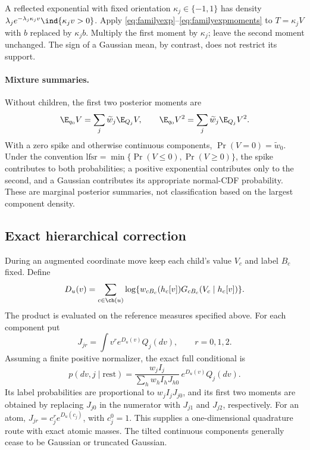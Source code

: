 A reflected exponential with fixed orientation \(\kappa_j\in\{-1,1\}\)
has density
\(\lambda_j e^{-\lambda_j\kappa_jv}\ind\{\kappa_jv>0\}\).
Apply \eqref{eq:familyexp}--\eqref{eq:familyexpmoments} to
\(T=\kappa_jV\) with \(b\) replaced by \(\kappa_jb\).
Multiply the first moment by \(\kappa_j\); leave the second moment unchanged.
The sign of a Gaussian mean, by contrast, does not restrict its support.

\paragraph{Mixture summaries.}
Without children, the first two posterior moments are
\[
\E_{q_0}V=\sum_j\widetilde w_j\E_{Q_j}V,\qquad
\E_{q_0}V^2=\sum_j\widetilde w_j\E_{Q_j}V^2.
\]
With a zero spike and otherwise continuous components,
\(\Pr(V=0)=\widetilde w_0\).
Under the convention
\(\mathrm{lfsr}=\min\{\Pr(V\leq0),\Pr(V\geq0)\}\),
the spike contributes to both probabilities; a positive exponential
contributes only to the second, and a Gaussian contributes its appropriate
normal-CDF probability. These are marginal posterior summaries, not
classification based on the largest component density.

\subsection{Exact hierarchical correction}
\label{sec:familycorrection}
During an augmented coordinate move keep each child's value \(V_c\) and
label \(B_c\) fixed. Define
\begin{equation}\label{eq:familyD}
D_u(v)=\sum_{c\in\ch(u)}
\log\{w_{cB_c}(h_c[v])G_{cB_c}(V_c\mid h_c[v])\}.
\end{equation}
The product is evaluated on the reference measures specified above.
For each component put
\[
J_{jr}=\int v^r e^{D_u(v)}Q_j(dv),\qquad r=0,1,2.
\]
Assuming a finite positive normalizer, the exact full conditional is
\begin{equation}\label{eq:familyfull}
p(dv,j\mid\mathrm{rest})
=\frac{w_jI_j}{\sum_h w_hI_hJ_{h0}}\,
       e^{D_u(v)}Q_j(dv).
\end{equation}
Its label probabilities are proportional to \(w_jI_jJ_{j0}\), and its
first two moments are obtained by replacing \(J_{j0}\) in the numerator
with \(J_{j1}\) and \(J_{j2}\), respectively. For an atom,
\(J_{jr}=c_j^r e^{D_u(c_j)}\), with \(c_j^0=1\).
This supplies a one-dimensional quadrature route with exact atomic masses.
The tilted continuous components generally cease to be Gaussian or
truncated Gaussian.

